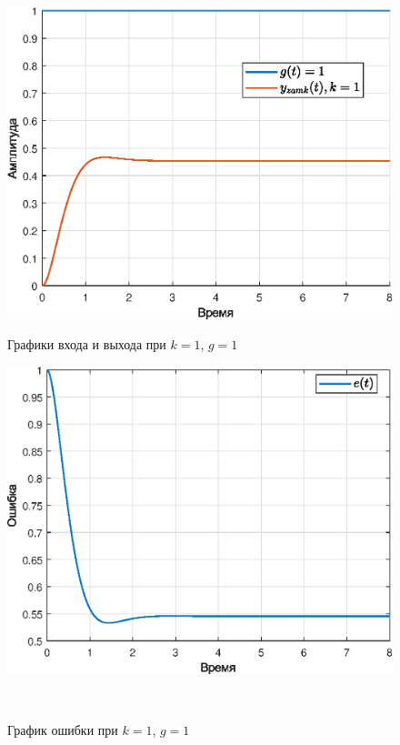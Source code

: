 \documentclass[a4paper]{article}
\begin{document}
\begin{figure}[H]
    \begin{minipage}{0.5\textwidth}
        \centering \includegraphics[width=\textwidth]{ex3/k1_g_a.eps}
        \caption{Графики входа и выхода при $k=1$, $g=1$}
    \end{minipage}\hfill
    \begin{minipage}{0.5\textwidth}
        \centering \includegraphics[width=\textwidth]{ex3/k1_g_a_error.eps}
        \caption{График ошибки при $k=1$, $g=1$}
    \end{minipage}\\[1em]
\end{figure}\noindent\
\end{document}
